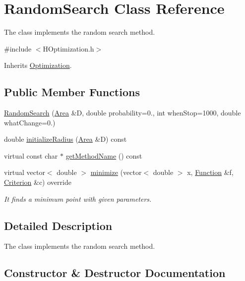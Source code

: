 \hypertarget{class_random_search}{}\section{Random\+Search Class Reference}
\label{class_random_search}


The class implements the random search method.  




{\ttfamily \#include $<$H\+Optimization.\+h$>$}



Inherits \hyperlink{class_optimization}{Optimization}.

\subsection*{Public Member Functions}
\begin{DoxyCompactItemize}
\item 
\hyperlink{class_random_search_a69c44344b0579f68c7e6d319b7a60456}{Random\+Search} (\hyperlink{class_area}{Area} \&D, double probability=0., int when\+Stop=1000, double what\+Change=0.)
\item 
double \hyperlink{class_random_search_a631dca8890448081991067610a26a549}{initialize\+Radius} (\hyperlink{class_area}{Area} \&D) const
\item 
virtual const char $\ast$ \hyperlink{class_random_search_a84278cf5d586b2576c38d3b7f274d9c1}{get\+Method\+Name} () const
\item 
virtual vector$<$ double $>$ \hyperlink{class_random_search_af3a56e45c9e8922d9d7809ce3b075391}{minimize} (vector$<$ double $>$ x, \hyperlink{class_function}{Function} \&f, \hyperlink{class_criterion}{Criterion} \&c) override
\begin{DoxyCompactList}\small\item\em It finds a minimum point with given parameters. \end{DoxyCompactList}\end{DoxyCompactItemize}


\subsection{Detailed Description}
The class implements the random search method. 

\subsection{Constructor \& Destructor Documentation}
\mbox{\label{class_random_search_a69c44344b0579f68c7e6d319b7a60456}} 
